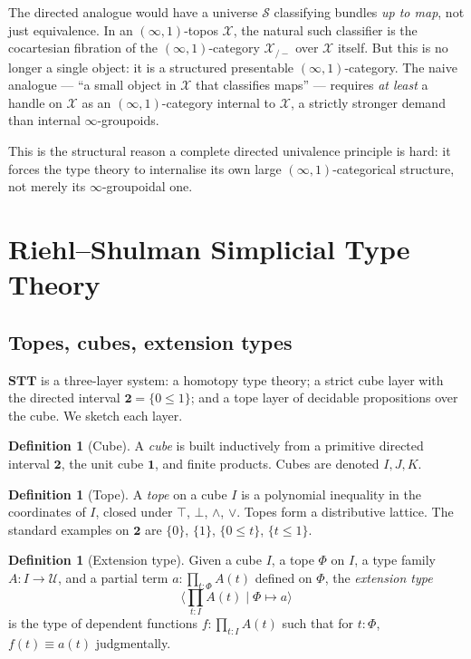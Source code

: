 \documentclass[12pt]{article}
\theoremstyle{definition}
\newtheorem{definition}[theorem]{Definition}
\theoremstyle{remark}
\newcommand{\U}{\mathcal{U}}
\newcommand{\STT}{\mathbf{STT}}
\newcommand{\twoI}{\mathbf{2}}
\begin{document}
The directed analogue would have a universe $\mathcal{S}$ classifying bundles \emph{up to map}, not just equivalence. In an $(\infty,1)$-topos $\mathcal{X}$, the natural such classifier is the cocartesian fibration of the $(\infty,1)$-category $\mathcal{X}_{/-}$ over $\mathcal{X}$ itself. But this is no longer a single object: it is a structured presentable $(\infty,1)$-category. The naive analogue --- ``a small object in $\mathcal{X}$ that classifies maps'' --- requires \emph{at least} a handle on $\mathcal{X}$ as an $(\infty,1)$-category internal to $\mathcal{X}$, a strictly stronger demand than internal $\infty$-groupoids.

This is the structural reason a complete directed univalence principle is hard: it forces the type theory to internalise its own large $(\infty,1)$-categorical structure, not merely its $\infty$-groupoidal one.

\section{Riehl--Shulman Simplicial Type Theory}\label{sec:rs}

\subsection{Topes, cubes, extension types}

$\STT$ is a three-layer system: a homotopy type theory; a strict cube layer with the directed interval $\twoI = \{0 \le 1\}$; and a tope layer of decidable propositions over the cube. We sketch each layer.

\begin{definition}[Cube]\label{def:cube}
A \emph{cube} is built inductively from a primitive directed interval $\twoI$, the unit cube $\mathbf{1}$, and finite products. Cubes are denoted $I, J, K$.
\end{definition}

\begin{definition}[Tope]\label{def:tope}
A \emph{tope} on a cube $I$ is a polynomial inequality in the coordinates of $I$, closed under $\top$, $\bot$, $\wedge$, $\vee$. Topes form a distributive lattice. The standard examples on $\twoI$ are $\{0\}$, $\{1\}$, $\{0 \le t\}$, $\{t \le 1\}$.
\end{definition}

\begin{definition}[Extension type]\label{def:exttype}
Given a cube $I$, a tope $\Phi$ on $I$, a type family $A : I \to \U$, and a partial term $a : \prod_{t : \Phi} A(t)$ defined on $\Phi$, the \emph{extension type}
\[
\big\langle \prod_{t : I} A(t) \;\big|\; \Phi \mapsto a \big\rangle
\]
is the type of dependent functions $f : \prod_{t : I} A(t)$ such that for $t : \Phi$, $f(t) \equiv a(t)$ judgmentally.
\end{definition}
\end{document}
